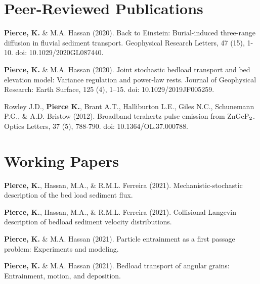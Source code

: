 \documentclass[11pt,letterpaper]{article}
\renewenvironment{itemize}{
	\begin{list}{}{
			\setlength{\leftmargin}{1.5em}
			\setlength{\rightmargin}{0em}  %
			\setlength{\itemsep}{0.25em}
			\setlength{\parskip}{0pt}
			\setlength{\parsep}{0.25em}
		}
	}{
	\end{list}
}
\renewenvironment{itemize}{
	\begin{list}{}{
			\setlength{\leftmargin}{1.5em}
			\setlength{\itemsep}{0.25em}
			\setlength{\parskip}{0pt}
			\setlength{\parsep}{0.25em}
		}
	}{
	\end{list}
}
\begin{document}
\section*{Peer-Reviewed Publications}
	
	\begin{itemize}
		\item[] \textbf{Pierce, K.} \& M.A. Hassan (2020). Back to Einstein: Burial-induced three-range diffusion in fluvial sediment transport. Geophysical Research Letters, 47 (15), 1-10. doi: 10.1029/2020GL087440.
		\item[] \textbf{Pierce, K.} \& M.A. Hassan (2020). Joint stochastic bedload transport and bed
		elevation model: Variance regulation and power-law rests. Journal of Geophysical Research: Earth Surface, 125 (4), 1–15. doi: 10.1029/2019JF005259.
		\item[] Rowley J.D., \textbf{Pierce K.}, Brant A.T., Halliburton L.E., Giles N.C., Schunemann P.G., \& A.D. Bristow (2012). Broadband terahertz pulse emission from ZnGeP$\textsubscript{2}$. Optics Letters, 37 (5),  788-790. doi: 10.1364/OL.37.000788.
	\end{itemize}


	
	\section*{Working Papers}
	
	\begin{itemize}
		\item[] \textbf{Pierce, K.}, Hassan, M.A., \& R.M.L. Ferreira (2021). Mechanistic-stochastic description of the bed load sediment flux.
		\item[] \textbf{Pierce, K.}, Hassan, M.A., \& R.M.L. Ferreira (2021). Collisional Langevin description of bedload sediment velocity distributions.
		\item[] \textbf{Pierce, K.} \& M.A. Hassan (2021). Particle entrainment as a first passage problem: Experiments and modeling.
		\item[] \textbf{Pierce, K.} \& M.A. Hassan (2021). Bedload transport of angular grains: Entrainment, motion, and deposition.
	\end{itemize}
	
\end{document}
